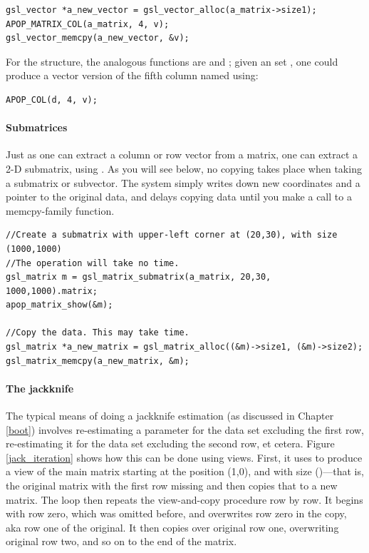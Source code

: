 \begin{lstlisting}
gsl_vector *a_new_vector = gsl_vector_alloc(a_matrix->size1);
APOP_MATRIX_COL(a_matrix, 4, v);
gsl_vector_memcpy(a_new_vector, &v);
\end{lstlisting}

For the  structure, the analogous functions are
 and ; given an  set
, one could produce a vector version of the fifth column named  
using:
\begin{lstlisting}
APOP_COL(d, 4, v);
\end{lstlisting}


\paragraph{Submatrices} Just as one can extract a column or row
vector from a matrix, one can extract a 2-D submatrix, using
. As you will see below, no copying takes
place when taking a submatrix or subvector. The system simply writes
down new coordinates and a pointer to the original data, and delays
copying data until you make a call to a {\ci memcpy}-family function. 

\begin{lstlisting}
//Create a submatrix with upper-left corner at (20,30), with size (1000,1000)
//The operation will take no time.
gsl_matrix m = gsl_matrix_submatrix(a_matrix, 20,30, 1000,1000).matrix;
apop_matrix_show(&m);

//Copy the data. This may take time.
gsl_matrix *a_new_matrix = gsl_matrix_alloc((&m)->size1, (&m)->size2);
gsl_matrix_memcpy(a_new_matrix, &m);
\end{lstlisting}

\paragraph{The jackknife}
The typical means of doing a jackknife estimation (as discussed in
Chapter \ref{boot}) involves re-estimating a parameter for the data set
excluding the first row, re-estimating it for the data set excluding the
second row, et cetera.  Figure \ref{jack_iteration}
shows how this can be done using views.  First, it uses
 to produce a view of the main matrix
starting at the position (1,0), and with size ()---that is, the original matrix with the first row missing
and then copies that to a new matrix. The  loop then repeats
the view-and-copy procedure row by row.  It begins with row zero, which
was omitted before, and overwrites row zero in the copy, aka row one of
the original. It then copies over original row one, overwriting original
row two, and so on to the end of the matrix.

